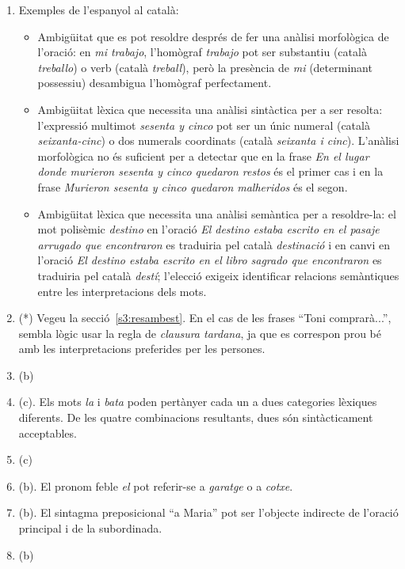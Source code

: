 \begin{enumerate}
  \item Exemples de l'espanyol al català:
    \begin{itemize}
    \item Ambigüitat que es pot resoldre després de fer una anàlisi
      morfològica de l'oració: en \emph{mi trabajo}, l'homògraf
      \emph{trabajo} pot ser substantiu (català \emph{treballo}) o
      verb (català \emph{treball}), però la presència de \emph{mi}
      (determinant possessiu) desambigua l'homògraf perfectament.
    \item Ambigüitat lèxica que necessita una anàlisi sintàctica per a
      ser resolta: l'expressió multimot \emph{sesenta y cinco} pot ser
      un únic numeral (català \emph{seixanta-cinc}) o dos numerals
      coordinats (català \emph{seixanta i cinc}). L'anàlisi
      morfològica no és suficient per a detectar que en la frase
      \emph{En el lugar donde murieron sesenta y cinco quedaron
        restos} és el primer cas i en la frase \emph{Murieron sesenta
        y cinco quedaron malheridos} és el segon.
    \item Ambigüitat lèxica que necessita una anàlisi semàntica per a
      resoldre-la: el mot polisèmic \emph{destino} en l'oració
      \emph{El destino estaba escrito en el pasaje arrugado que
        encontraron} es traduiria pel català \emph{destinació} i en
      canvi en l'oració \emph{El destino estaba escrito en el libro
        sagrado que encontraron} es traduiria pel català \emph{destí};
      l'elecció exigeix identificar relacions semàntiques entre les
      interpretacions dels mots.

    \end{itemize}


      
    \item(*) Vegeu la secció~\ref{s3:resambest}.  En el cas de les
      frases ``Toni comprarà...'', sembla lògic usar la regla de {\em
        clausura tardana}, ja que es correspon prou bé amb les
      interpretacions preferides per les persones.

\item (b)
\item (c). Els mots \emph{la} i \emph{bata} poden pertànyer cada un
  a dues categories lèxiques diferents. De les quatre combinacions
  resultants, dues són sintàcticament acceptables.
\item (c)
\item (b). El pronom feble \emph{el} pot referir-se a \emph{garatge}
  o a \emph{cotxe}.
\item (b). El sintagma preposicional ``a Maria'' pot ser l'objecte
  indirecte de l'oració principal i de la subordinada.
\item (b)


\end{enumerate}
